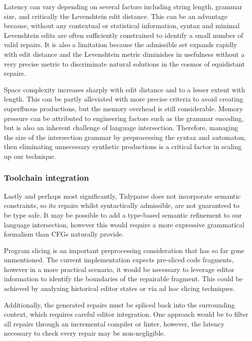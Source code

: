 \documentclass[sigplan,review,acmsmall,nonacm,screen,anonymous]{acmart}\settopmatter{printfolios=false,printccs=false,printacmref=false}
\begin{document}
Latency can vary depending on several factors including string length, grammar size, and critically the Levenshtein edit distance. This can be an advantage because, without any contextual or statistical information, syntax and minimal Levenshtein edits are often sufficiently constrained to identify a small number of valid repairs. It is also a limitation because the admissible set expands rapidly with edit distance and the Levenshtein metric diminishes in usefulness without a very precise metric to discriminate natural solutions in the cosmos of equidistant repairs.

Space complexity increases sharply with edit distance and to a lesser extent with length. This can be partly alleviated with more precise criteria to avoid creating superfluous productions, but the memory overhead is still considerable. Memory pressure can be attributed to engineering factors such as the grammar encoding, but is also an inherent challenge of language intersection. Therefore, managing the size of the intersection grammar by preprocessing the syntax and automaton, then eliminating unnecessary synthetic productions is a critical factor in scaling up our technique.

\subsubsection{Toolchain integration}

Lastly and perhaps most significantly, Tidyparse does not incorporate semantic constraints, so its repairs whilst syntactically admissible, are not guaranteed to be type safe. It may be possible to add a type-based semantic refinement to our language intersection, however this would require a more expressive grammatical formalism than CFGs naturally provide.

Program slicing is an important preprocessing consideration that has so far gone unmentioned. The current implementation expects pre-sliced code fragments, however in a more practical scenario, it would be necessary to leverage editor information to identify the boundaries of the repairable fragment. This could be achieved by analyzing historical editor states or via ad hoc slicing techniques.

Additionally, the generated repairs must be spliced back into the surrounding context, which requires careful editor integration. One approach would be to filter all repairs through an incremental compiler or linter, however, the latency necessary to check every repair may be non-negligible.
\end{document}
